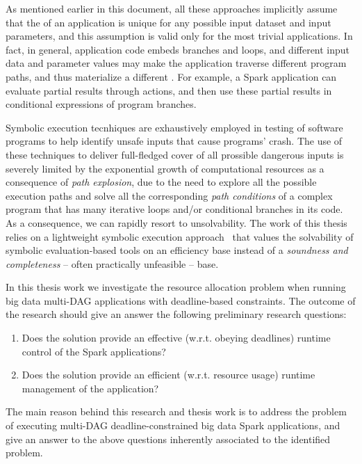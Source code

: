 As mentioned earlier in this document, all these approaches implicitly assume that the \plan of an application is unique for any possible input dataset and input parameters, and this assumption is valid only for the most trivial applications. In fact, in general, application code embeds branches and loops, and different input data and parameter values may make the application traverse different program paths, and thus materialize a different \plan. For example, a Spark application can evaluate partial results through actions, and then use these partial results in conditional expressions of program branches.

Symbolic execution tecnhiques are exhaustively employed in testing of software programs to help identify unsafe inputs that cause programs' crash. The use of these techniques to deliver full-fledged cover of all prossible dangerous inputs is severely limited by the exponential growth of computational resources as a consequence of \textit{path explosion}, due to the need to explore all the possible execution paths and solve all the corresponding \textit{path conditions} of a complex program that has many iterative loops and/or conditional branches in its code. As a consequence, we can rapidly resort to unsolvability. The work of this thesis relies on a lightweight symbolic execution  approach~\cite{Baresi-Quattrocchi-Denaro:2019} that values the solvability of symbolic evaluation-based tools on an efficiency base instead of a \textit{soundness and completeness} -- often practically unfeasible -- base.

In this thesis work we investigate the resource allocation problem when running big data multi-DAG applications with deadline-based \qos constraints. The outcome of the research should give an answer the following preliminary research questions:
\begin{enumerate} 
	\item Does the solution provide an effective (w.r.t. obeying deadlines) runtime control of the Spark applications?
	\item Does the solution provide an efficient (w.r.t. resource usage) runtime management of the application?
\end{enumerate}

The main reason behind this research and thesis work is to address the problem of executing multi-DAG deadline-constrained big data Spark applications, and give an answer to the above questions inherently associated to the identified problem.

